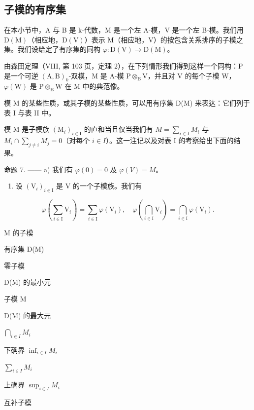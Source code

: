 \subsection{子模的有序集}

在本小节中，A 与 B 是 k-代数，M 是一个左 A-模，V 是一个左 B-模。我们用 \(\mathrm{D}(\mathrm{M})\)（相应地，\(\mathrm{D}(\mathrm{V})\)）表示 M（相应地，V）的按包含关系排序的子模之集。我们设给定了有序集的同构 \(\varphi : \mathrm{D}(\mathrm{V}) \to \mathrm{D}(\mathrm{M})\)。

由森田定理（VIII, 第 103 页，定理 2），在下列情形我们得到这样一个同构：P 是一个可逆 \((\mathrm{A},\mathrm{B})_k\)-双模，M 是 A-模 \(\mathrm{P} \otimes_{\mathrm{B}} \mathrm{V}\)，并且对 V 的每个子模 W，\(\varphi(\mathrm{W})\) 是 \(\mathrm{P} \otimes_{\mathrm{B}} \mathrm{W}\) 在 M 中的典范像。

模 M 的某些性质，或其子模的某些性质，可以用有序集 D(M) 来表达：它们列于表 I 与表 II 中。

模 M 是子模族 \((\mathrm{M}_{i})_{i\in\mathrm{I}}\) 的直和当且仅当我们有 \(M=\sum_{i\in I}M_{i}\) 与 \(M_{i}\cap\sum_{j\neq i}M_{j}=0\)（对每个 \(i\in I\)）。这一注记以及对表 I 的考察给出下面的结果。

命题 7. —— a) 我们有 \(\varphi(0)=0\) 及 \(\varphi(V)=M\)。

\begin{enumerate}
\def\labelenumi{\alph{enumi})}
\setcounter{enumi}{1}
\tightlist
\item
  设 \((\mathrm{V}_i)_{i\in \mathrm{I}}\) 是 V 的一个子模族。我们有
\end{enumerate}

\[
\varphi \left(\sum_ {i \in \mathrm{I}} \mathrm{V} _ {i}\right) = \sum_ {i \in \mathrm{I}} \varphi (\mathrm{V} _ {i}), \quad \varphi \left(\bigcap_ {i \in \mathrm{I}} \mathrm{V} _ {i}\right) = \bigcap_ {i \in \mathrm{I}} \varphi (\mathrm{V} _ {i}).
\]

M 的子模

有序集 D(M)

零子模

D(M) 的最小元

子模 M

D(M) 的最大元

\(\bigcap_{i\in I} M_i\)

下确界 \(\inf_{i\in I} M_i\)

\(\sum_{i\in I} M_i\)

上确界 \(\sup_{i\in I} M_i\)

互补子模

